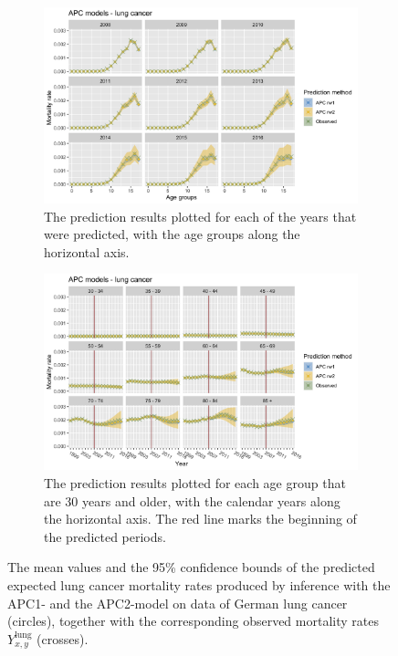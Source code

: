 \begin{figure}[h!]
    \centering
    \begin{subfigure}[b]{.75\linewidth}
        \includegraphics[width=\linewidth]{real-data/real-data-univariate/Figures/univariate-APC-by-age-lung.png}
        \caption{The prediction results plotted for each of the years that were predicted, with the age groups along the horizontal axis.}
        \label{fig:uv-APC-lung-top}
    \end{subfigure}
    
    \begin{subfigure}[b]{.75\linewidth}
        \includegraphics[width=\linewidth]{real-data/real-data-univariate/Figures/univariate-APC-by-period-lung.png}
        \caption{The prediction results plotted for each age group that are 30 years and older, with the calendar years along the horizontal axis. The red line marks the beginning of the predicted periods. }
        \label{fig:uv-APC-lung-bottom}
    \end{subfigure}
    \caption{The mean values and the 95\% confidence bounds of the predicted expected lung cancer mortality rates produced by inference with the APC1- and the APC2-model on data of German lung cancer (circles), together with the corresponding observed mortality rates $Y_{x,y}^{\text{lung}}$ (crosses).}
    \label{fig:uv-APC-lung}
\end{figure}


